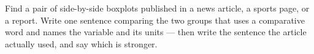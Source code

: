 \documentclass[12pt]{article}
\begin{document}
\vspace{0.12in}

\boxguard[12]
\begin{extensionbox}
\small
Find a pair of side-by-side boxplots published in a news article, a sports page, or a report.
Write one sentence comparing the two groups that uses a comparative word and names the variable
and its units --- then write the sentence the article actually used, and say which is stronger.\\[4pt]
\end{extensionbox}

\vspace{0.12in}
\end{document}
